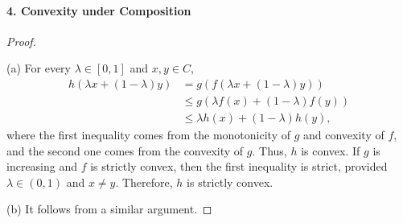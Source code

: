   \paragraph{4. Convexity under Composition}
  \begin{proof}
    $\,$\par
    (a) For every $\lambda\in[0,1]$ and $x,y\in C$,
    \begin{align*}
      h(\lambda x+(1-\lambda)y)
      &=g(f(\lambda x+(1-\lambda)y))\\
      &\le g(\lambda f(x)+(1-\lambda)f(y)) \\
      &\le \lambda h(x)+(1-\lambda)h(y),
    \end{align*}
    where the first inequality comes from the monotonicity of $g$ and convexity
    of $f$, and the second one comes from the convexity of $g$. Thus, $h$ is
    convex. If $g$ is increasing and $f$ is strictly convex, then the first
    inequality is strict, provided $\lambda\in(0,1)$ and $x\ne y$. Therefore,
    $h$ is strictly convex.\par
    (b) It follows from a similar argument.
  \end{proof}
  
